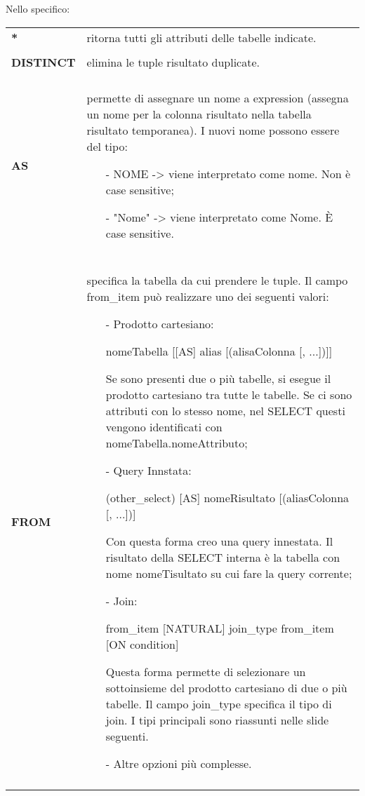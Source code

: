 \documentclass[a4paper, 10pt]{report}
\begin{document}
Nello specifico:
\begin{longtable}{ p{}  p{}}
\textbf{*} & ritorna tutti gli attributi delle tabelle indicate.
\\\\
\textbf{DISTINCT} & elimina le tuple risultato duplicate.
\\\\
\textbf{AS} & permette di assegnare un nome a expression (assegna un nome per la colonna risultato nella tabella risultato temporanea). I nuovi nome possono essere del tipo:
\begin{itemize}
\item[-] NOME -> viene interpretato come nome. Non è case sensitive;
\item[-] "Nome" -> viene interpretato come Nome. È case sensitive.
\end{itemize}
\\\\
\textbf{FROM} & specifica la tabella da cui prendere le tuple. Il campo from\_item può realizzare uno dei seguenti valori:
\begin{itemize}
\item[-] Prodotto cartesiano:
\begin{code}
	nomeTabella [[AS] alias [(alisaColonna [, ...])]]
\end{code}
\noindent Se sono presenti due o più tabelle, si esegue il prodotto cartesiano tra tutte le tabelle. Se ci sono attributi con lo stesso nome, nel SELECT questi vengono identificati con nomeTabella.nomeAttributo;
\item[-] Query Innstata:
\begin{code}
	(other_select) [AS] nomeRisultato [(aliasColonna [, ...])]
\end{code}
\noindent Con questa forma creo una query innestata. Il risultato della SELECT interna è la tabella con nome nomeTisultato su cui fare la query corrente;
\item[-] Join:
\begin{code}
	from_item [NATURAL] join_type from_item [ON condition]
\end{code}
\noindent Questa forma permette di selezionare un sottoinsieme del prodotto cartesiano di due o più tabelle. Il campo join\_type speciﬁca il tipo di join. I tipi principali sono riassunti nelle slide seguenti. 
\item[-] Altre opzioni più complesse.
\end{itemize}
\\\\

\end{longtable}
\end{document}
